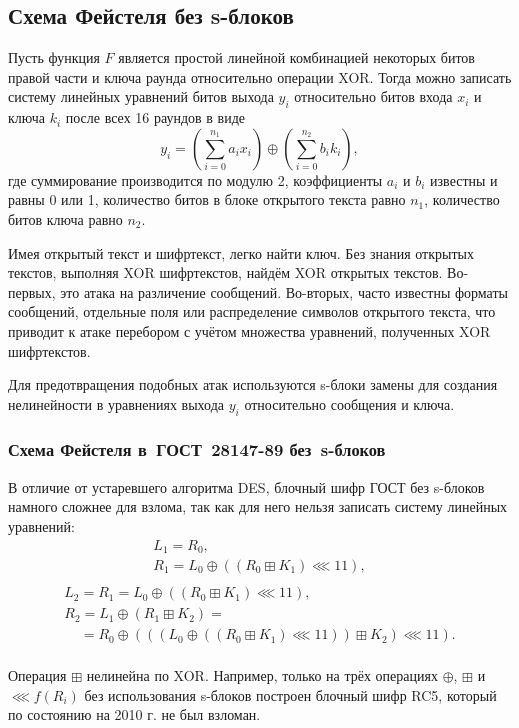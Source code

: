 \subsection{Схема Фейстеля без s-блоков}

Пусть функция $F$ является простой линейной комбинацией некоторых битов правой части и ключа раунда относительно операции XOR. Тогда можно записать систему линейных уравнений битов выхода $y_i$ относительно битов входа $x_i$ и ключа $k_i$ после всех 16 раундов в виде
    \[ y_i = \left(\sum_{i=0}^{n_1} a_i x_i\right) \oplus \left(\sum_{i=0}^{n_2} b_i k_i\right), \]
где суммирование производится по модулю 2, коэффициенты $a_i$ и $b_i$ известны и равны 0 или 1, количество битов в блоке открытого текста равно $n_1$, количество битов ключа равно $n_2$.

Имея открытый текст и шифртекст, легко найти ключ. Без знания открытых текстов, выполняя XOR шифртекстов, найдём XOR открытых текстов. Во-первых, это атака на различение сообщений. Во-вторых, часто известны форматы сообщений, отдельные поля или распределение символов открытого текста, что приводит к атаке перебором с учётом множества уравнений, полученных XOR шифртекстов.

Для предотвращения подобных атак используются s-блоки замены для создания нелинейности в уравнениях выхода $y_i$ относительно сообщения и ключа.


\subsubsection[Схема Фейстеля в ГОСТ 28147-89 без s-блоков]{Схема Фейстеля в~ГОСТ~28147-89 без~s-блоков}

В отличие от устаревшего алгоритма DES, блочный шифр ГОСТ без s-блоков намного сложнее для взлома, так как для него нельзя записать систему линейных уравнений:
\[
    \begin{array}{l}
        L_1 = R_0, \\
        R_1 = L_0 \oplus ((R_0 \boxplus K_1) \lll 11), \\
    \end{array}
\] \[
    \begin{array}{l}
        L_2 = R_1 = L_0 \oplus ((R_0 \boxplus K_1) \lll 11), \\
        R_2 = L_1 \oplus (R_1 \boxplus K_2)  = \\
        ~~~~~= R_0 \oplus (((L_0 \oplus ((R_0 \boxplus K_1) \lll 11)) \boxplus K_2) \lll 11). \\
    \end{array}
\]

Операция $\boxplus$ нелинейна по XOR. Например, только на трёх операциях $\oplus$, $\boxplus$ и $\lll f(R_i)$ без использования s-блоков построен блочный шифр RC5, который по состоянию на 2010 г. не был взломан.
